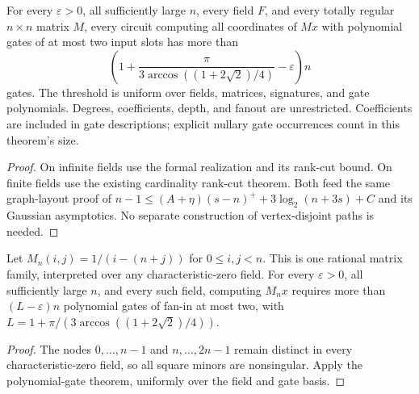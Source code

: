 \begin{theorem}
  \label{thm:lowerbounds-algebraic-polynomial-totally-regular}
  \leanok
  For every $\varepsilon>0$, all sufficiently large $n$, every field $F$,
  and every totally regular $n\times n$ matrix $M$, every circuit computing
  all coordinates of $Mx$ with polynomial gates of at most two input slots
  has more than
  \[
    \left(1+\frac{\pi}{3\arccos((1+2\sqrt2)/4)}-\varepsilon\right)n
  \]
  gates. The threshold is uniform over fields, matrices, signatures, and
  gate polynomials. Degrees, coefficients, depth, and fanout are unrestricted.
  Coefficients are included in gate descriptions; explicit nullary gate
  occurrences count in this theorem's size.
\end{theorem}
\begin{proof}
  \leanok
  On infinite fields use the formal realization and its rank-cut bound.
  On finite fields use the existing cardinality rank-cut theorem. Both feed
  the same graph-layout proof of
  $n-1\le(A+\eta)(s-n)^++3\log_2(n+3s)+C$ and its Gaussian asymptotics.
  No separate construction of vertex-disjoint paths is needed.
\end{proof}

\begin{theorem}
  \label{thm:lowerbounds-algebraic-polynomial-cauchy}
  \leanok
  Let $M_n(i,j)=1/(i-(n+j))$ for $0\le i,j<n$. This is one rational matrix
  family, interpreted over any characteristic-zero field. For every
  $\varepsilon>0$, all sufficiently large $n$, and every such field, computing
  $M_nx$ requires more than $(L-\varepsilon)n$ polynomial gates of fan-in at
  most two, with $L=1+\pi/(3\arccos((1+2\sqrt2)/4))$.
\end{theorem}
\begin{proof}
  \leanok
  The nodes $0,\ldots,n-1$ and $n,\ldots,2n-1$ remain distinct in every
  characteristic-zero field, so all square minors are nonsingular. Apply
  the polynomial-gate theorem, uniformly over the field and gate basis.
\end{proof}

